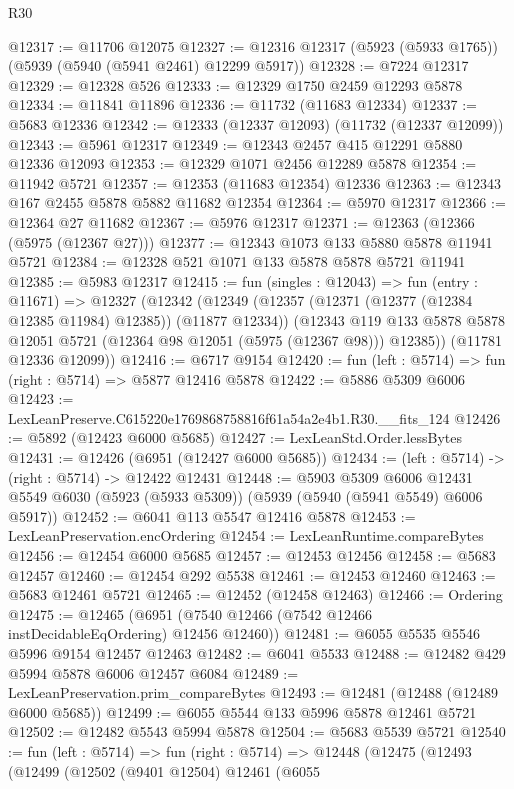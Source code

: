\begin{lexlean}{R30}
\begin{coremodule}
@12317 := @11706 @12075
@12327 := @12316 @12317 (@5923 (@5933 @1765)) (@5939 (@5940 (@5941 @2461) @12299 @5917))
@12328 := @7224 @12317
@12329 := @12328 @526
@12333 := @12329 @1750 @2459 @12293 @5878
@12334 := @11841 @11896
@12336 := @11732 (@11683 @12334)
@12337 := @5683 @12336
@12342 := @12333 (@12337 @12093) (@11732 (@12337 @12099))
@12343 := @5961 @12317
@12349 := @12343 @2457 @415 @12291 @5880 @12336 @12093
@12353 := @12329 @1071 @2456 @12289 @5878
@12354 := @11942 @5721
@12357 := @12353 (@11683 @12354) @12336
@12363 := @12343 @167 @2455 @5878 @5882 @11682 @12354
@12364 := @5970 @12317
@12366 := @12364 @27 @11682
@12367 := @5976 @12317
@12371 := @12363 (@12366 (@5975 (@12367 @27)))
@12377 := @12343 @1073 @133 @5880 @5878 @11941 @5721
@12384 := @12328 @521 @1071 @133 @5878 @5878 @5721 @11941
@12385 := @5983 @12317
@12415 := fun (singles : @12043) =>
  fun (entry : @11671) =>
  @12327
    (@12342
      (@12349
        (@12357 (@12371 (@12377 (@12384 @12385 @11984) @12385)) (@11877 @12334))
        (@12343 @119 @133 @5878 @5878 @12051 @5721 (@12364 @98 @12051 (@5975 (@12367 @98))) @12385))
      (@11781 @12336 @12099))
@12416 := @6717 @9154
@12420 := fun (left : @5714) => fun (right : @5714) => @5877 @12416 @5878
@12422 := @5886 @5309 @6006
@12423 := LexLeanPreserve.C615220e1769868758816f61a54a2e4b1.R30.__fits_124
@12426 := @5892 (@12423 @6000 @5685)
@12427 := LexLeanStd.Order.lessBytes
@12431 := @12426 (@6951 (@12427 @6000 @5685))
@12434 := (left : @5714) -> (right : @5714) -> @12422 @12431
@12448 := @5903
    @5309
    @6006
    @12431
    @5549
    @6030
    (@5923 (@5933 @5309))
    (@5939 (@5940 (@5941 @5549) @6006 @5917))
@12452 := @6041 @113 @5547 @12416 @5878
@12453 := LexLeanPreservation.encOrdering
@12454 := LexLeanRuntime.compareBytes
@12456 := @12454 @6000 @5685
@12457 := @12453 @12456
@12458 := @5683 @12457
@12460 := @12454 @292 @5538
@12461 := @12453 @12460
@12463 := @5683 @12461 @5721
@12465 := @12452 (@12458 @12463)
@12466 := Ordering
@12475 := @12465 (@6951 (@7540 @12466 (@7542 @12466 instDecidableEqOrdering) @12456 @12460))
@12481 := @6055 @5535 @5546 @5996 @9154 @12457 @12463
@12482 := @6041 @5533
@12488 := @12482 @429 @5994 @5878 @6006 @12457 @6084
@12489 := LexLeanPreservation.prim_compareBytes
@12493 := @12481 (@12488 (@12489 @6000 @5685))
@12499 := @6055 @5544 @133 @5996 @5878 @12461 @5721
@12502 := @12482 @5543 @5994 @5878
@12504 := @5683 @5539 @5721
@12540 := fun (left : @5714) =>
  fun (right : @5714) =>
  @12448
    (@12475
      (@12493
        (@12499
          (@12502
            (@9401 @12504)
            @12461
            (@6055

\end{coremodule}
\end{lexlean}
